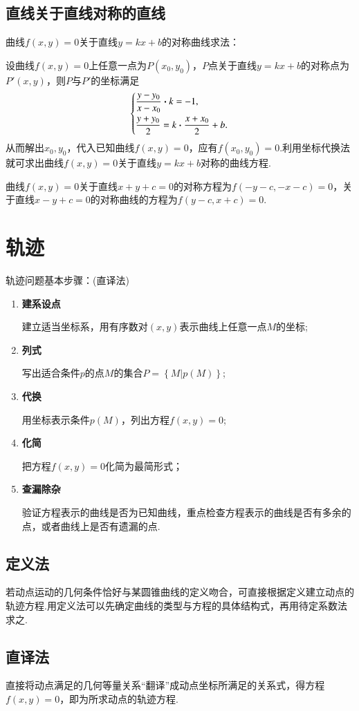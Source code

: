 \documentclass{BHCexam}
\begin{document}
\subsection{直线关于直线对称的直线}
曲线$ f(x,y)=0 $关于直线$ y=kx+b $的对称曲线求法：\par 
设曲线$ f(x,y)=0 $上任意一点为$ P(x_0,y_0) $，$ P $点关于直线$ y=kx+b $的对称点为$ P'(x,y) $，则$ P $与$ P' $的坐标满足
\[\begin{dcases}
\dfrac{y-y_0}{x-x_0}\bm{\cdot}k=-1,\\
\dfrac{y+y_0}{2}=k\bm{\cdot}\dfrac{x+x_0}{2}+b.
\end{dcases}\]
从而解出$ x_0,y_0 $，代入已知曲线$ f(x,y)=0 $，应有$ f(x_0,y_0) =0$.利用坐标代换法就可求出曲线$ f(x,y)=0 $关于直线$ y=kx+b $对称的曲线方程.\par 
{\kaishu 曲线$ f(x,y)=0 $关于直线$ x+y+c=0 $的对称方程为$ f(-y-c,-x-c)=0 $，关于直线$ x-y+c=0 $的对称曲线的方程为$ f(y-c,x+c)=0 $.\par
}
\section{轨迹}
轨迹问题基本步骤：(直译法)
\begin{enumerate}[1)]
\item \textbf{建系设点}\par 
 建立适当坐标系，用有序数对$ (x,y) $表示曲线上任意一点$ M $的坐标;
\item \textbf{列式}\par 
写出适合条件$ p $的点$ M $的集合$ P=\left\{M\left|p(M)\right.\right\} $;
\item \textbf{代换}\par 
用坐标表示条件$ p\left(M\right) $，列出方程$ f(x,y)=0 $;
\item \textbf{化简}\par 
把方程$ f(x,y)=0 $化简为最简形式；
\item \textbf{查漏除杂}\par 
验证方程表示的曲线是否为已知曲线，重点检查方程表示的曲线是否有多余的点，或者曲线上是否有遗漏的点.
\end{enumerate}
\subsection{定义法}
若动点运动的几何条件恰好与某圆锥曲线的定义吻合，可直接根据定义建立动点的轨迹方程.用定义法可以先确定曲线的类型与方程的具体结构式，再用待定系数法求之.
\subsection{直译法}
直接将动点满足的几何等量关系“翻译”成动点坐标所满足的关系式，得方程$ f(x,y)=0 $，即为所求动点的轨迹方程.
\end{document}

